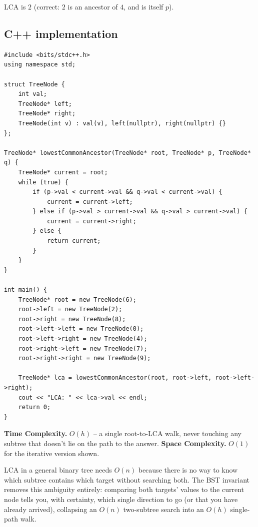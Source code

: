 LCA is $2$ (correct: $2$ is an ancestor of $4$, and is itself $p$).

\subsection*{C++ implementation}

\begin{lstlisting}
#include <bits/stdc++.h>
using namespace std;

struct TreeNode {
    int val;
    TreeNode* left;
    TreeNode* right;
    TreeNode(int v) : val(v), left(nullptr), right(nullptr) {}
};

TreeNode* lowestCommonAncestor(TreeNode* root, TreeNode* p, TreeNode* q) {
    TreeNode* current = root;
    while (true) {
        if (p->val < current->val && q->val < current->val) {
            current = current->left;
        } else if (p->val > current->val && q->val > current->val) {
            current = current->right;
        } else {
            return current;
        }
    }
}

int main() {
    TreeNode* root = new TreeNode(6);
    root->left = new TreeNode(2);
    root->right = new TreeNode(8);
    root->left->left = new TreeNode(0);
    root->left->right = new TreeNode(4);
    root->right->left = new TreeNode(7);
    root->right->right = new TreeNode(9);

    TreeNode* lca = lowestCommonAncestor(root, root->left, root->left->right);
    cout << "LCA: " << lca->val << endl;
    return 0;
}
\end{lstlisting}

\begin{complexitybox}
\textbf{Time Complexity.} $O(h)$ -- a single root-to-LCA walk, never
touching any subtree that doesn't lie on the path to the answer.
\textbf{Space Complexity.} $O(1)$ for the iterative version shown.
\end{complexitybox}

\begin{takeawaybox}
LCA in a general binary tree needs $O(n)$ because there is no way to know
which subtree contains which target without searching both. The BST
invariant removes this ambiguity entirely: comparing both targets'
values to the current node tells you, with certainty, which single
direction to go (or that you have already arrived), collapsing an
$O(n)$ two-subtree search into an $O(h)$ single-path walk.
\end{takeawaybox}

